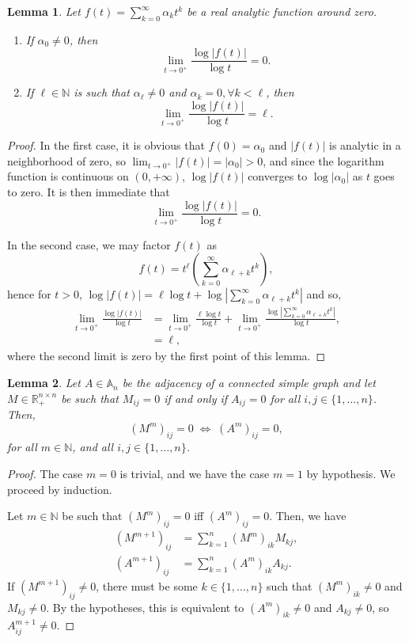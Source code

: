 \documentclass[11pt]{article}
\def\N{\mathbb{N}}
\def\R{\mathbb{R}}
\def\log{\operatorname{log}}
\def\AA{\mathbb{A}}
\newtheorem{lemma}{Lemma}[section]
\theoremstyle{definition}
\begin{document}
\begin{lemma} \label{lemma:log-taylor}
    Let $f(t) = \sum_{k=0}^\infty \alpha_k t^k$ be a real analytic function around zero.
    \begin{enumerate}
        \item If $\alpha_0 \neq 0$, then
        $$ \lim_{t\rightarrow 0^+} \frac{\log |f(t)|}{\log t} = 0. $$
        \item If $\ell \in \N$ is such that $\alpha_\ell \neq 0$ and $\alpha_k = 0, \forall k < \ell$, then
        $$ \lim_{t\rightarrow 0^+} \frac{\log |f(t)|}{\log t} = \ell. $$
    \end{enumerate} 
\end{lemma}
\begin{proof}
    In the first case, it is obvious that $f(0)=\alpha_0$ and $|f(t)|$ is analytic in a neighborhood of zero, so $\lim_{t\rightarrow 0^+} |f(t)| = |\alpha_0| > 0$, and since the logarithm function is continuous on $(0,+\infty)$, $\log |f(t)|$ converges to $\log |\alpha_0|$ as $t$ goes to zero. It is then immediate that
    $$ \lim_{t \rightarrow 0^+} \frac{\log |f(t)|}{\log t} = 0. $$
    
    In the second case, we may factor $f(t)$ as
    $$ f(t) = t^\ell \left( \sum_{k=0}^\infty \alpha_{\ell+k} t^k \right), $$
    hence for $t>0$, $\log |f(t)| = \ell \log t + \log |\sum_{k=0}^\infty \alpha_{\ell+k} t^k|$ and so,
    \begin{align*}
        \lim_{t\rightarrow 0^+} \frac{\log |f(t)|}{\log t} &= \lim_{t\rightarrow 0^+} \frac{\ell \log t}{\log t} + \lim_{t \rightarrow 0^+} \frac{\log |\sum_{k=0}^\infty \alpha_{\ell+k} t^k|}{\log t},\\
        &= \ell,
    \end{align*}
    where the second limit is zero by the first point of this lemma.
\end{proof}

\begin{lemma} \label{lemma:weighted-adjacency-powers}
    Let $A \in \AA_n$ be the adjacency of a connected simple graph and let $M \in \R_+^{n\times n}$ be such that $M_{ij}=0$ if and only if $A_{ij}=0$ for all $i,j\in \{1,\dots,n\}$. Then,
    $$ (M^m)_{ij} = 0 \; \Leftrightarrow \; (A^m)_{ij} = 0, $$
    for all $m\in \N$, and all $i,j \in \{1,\dots,n\}$.
\end{lemma}
\begin{proof}
    The case $m=0$ is trivial, and we have the case $m=1$ by hypothesis. We proceed by induction.

    Let $m \in \N$ be such that $(M^m)_{ij} = 0$ iff $(A^m)_{ij}=0$. Then, we have
    \begin{align*}
        (M^{m+1})_{ij} &= \sum_{k=1}^n (M^m)_{ik} M_{kj},\\
        (A^{m+1})_{ij} &= \sum_{k=1}^n (A^m)_{ik} A_{kj}.
    \end{align*}
    If $(M^{m+1})_{ij} \neq 0$, there must be some $k \in \{1,\dots,n\}$ such that $(M^m)_{ik} \neq 0$ and $M_{kj} \neq 0$. By the hypotheses, this is equivalent to $(A^m)_{ik}\neq 0$ and $A_{kj}\neq 0$, so $A^{m+1}_{ij}\neq 0$.
\end{proof}
\end{document}
